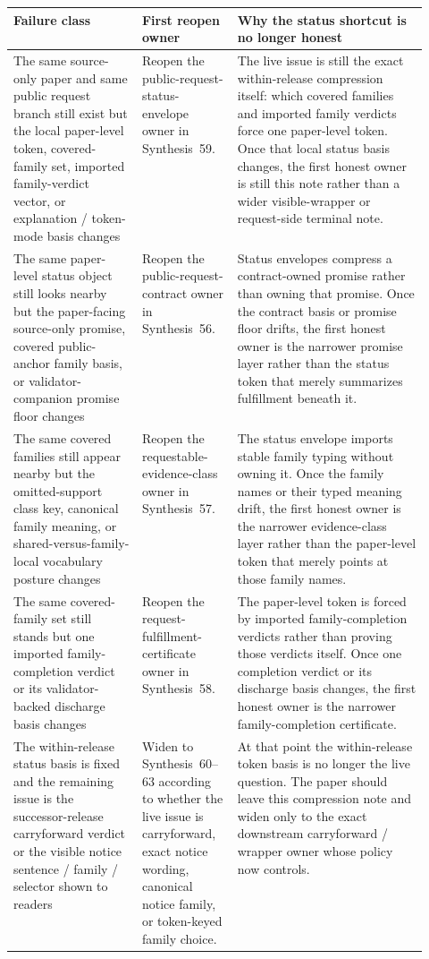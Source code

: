 \documentclass[11pt]{article}
\begin{document}
\begin{table}[t]
\centering
\small
\begin{tabularx}{\linewidth}{@{}p{0.31\linewidth}p{0.23\linewidth}X@{}}
\toprule
Failure class & First reopen owner & Why the status shortcut is no longer honest \\
\midrule
The same source-only paper and same public request branch still exist but the local paper-level token, covered-family set, imported family-verdict vector, or explanation / token-mode basis changes & Reopen the public-request-status-envelope owner in Synthesis~59. & The live issue is still the exact within-release compression itself: which covered families and imported family verdicts force one paper-level token. Once that local status basis changes, the first honest owner is still this note rather than a wider visible-wrapper or request-side terminal note. \\
The same paper-level status object still looks nearby but the paper-facing source-only promise, covered public-anchor family basis, or validator-companion promise floor changes & Reopen the public-request-contract owner in Synthesis~56. & Status envelopes compress a contract-owned promise rather than owning that promise. Once the contract basis or promise floor drifts, the first honest owner is the narrower promise layer rather than the status token that merely summarizes fulfillment beneath it. \\
The same covered families still appear nearby but the omitted-support class key, canonical family meaning, or shared-versus-family-local vocabulary posture changes & Reopen the requestable-evidence-class owner in Synthesis~57. & The status envelope imports stable family typing without owning it. Once the family names or their typed meaning drift, the first honest owner is the narrower evidence-class layer rather than the paper-level token that merely points at those family names. \\
The same covered-family set still stands but one imported family-completion verdict or its validator-backed discharge basis changes & Reopen the request-fulfillment-certificate owner in Synthesis~58. & The paper-level token is forced by imported family-completion verdicts rather than proving those verdicts itself. Once one completion verdict or its discharge basis changes, the first honest owner is the narrower family-completion certificate. \\
The within-release status basis is fixed and the remaining issue is the successor-release carryforward verdict or the visible notice sentence / family / selector shown to readers & Widen to Synthesis~60--63 according to whether the live issue is carryforward, exact notice wording, canonical notice family, or token-keyed family choice. & At that point the within-release token basis is no longer the live question. The paper should leave this compression note and widen only to the exact downstream carryforward / wrapper owner whose policy now controls. \\

\end{tabularx}
\end{table}
\end{document}
